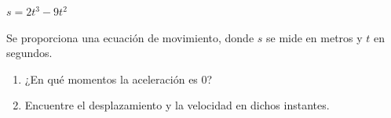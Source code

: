 \item $s = 2t^3 - 9t^2$
\par
Se proporciona una ecuación de movimiento, donde $s$ se mide en metros y $t$ en segundos.
\begin{enumerate}
    \item[(a)] ¿En qué momentos la aceleración es 0?
    \item[(b)] Encuentre el desplazamiento y la velocidad en dichos instantes.
\end{enumerate}
